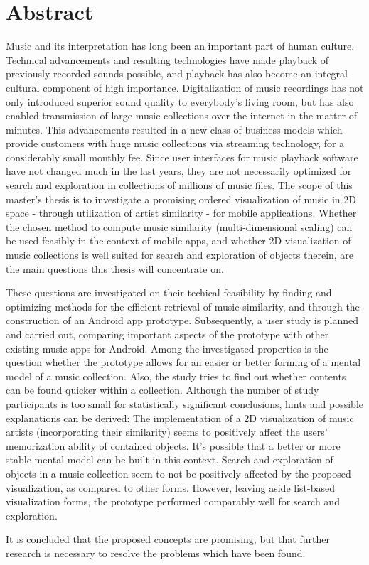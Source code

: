 \chapter*{Abstract}

Music and its interpretation has long been an important part of human culture. Technical advancements and resulting technologies have made playback of previously recorded sounds possible, and playback has also become an integral cultural component of high importance. Digitalization of music recordings has not only introduced superior sound quality to everybody's living room, but has also enabled transmission of large music collections over the internet in the matter of minutes.
This advancements resulted in a new class of business models which provide customers with huge music collections via streaming technology, for a considerably small monthly fee. Since user interfaces for music playback software have not changed much in the last years, they are not necessarily optimized for search and exploration in collections of millions of music files. The scope of this master's thesis is to investigate a promising ordered visualization of music in 2D space - through utilization of artist similarity - for mobile applications.
Whether the chosen method to compute music similarity (multi-dimensional scaling) can be used feasibly in the context of mobile apps, and whether 2D visualization of music collections is well suited for search and exploration of objects therein, are the main questions this thesis will concentrate on.

These questions are investigated on their techical feasibility by finding and optimizing methods for the efficient retrieval of music similarity, and through the construction of an Android app prototype. Subsequently, a user study is planned and carried out, comparing important aspects of the prototype with other existing music apps for Android. Among the investigated properties is the question whether the prototype allows for an easier or better forming of a mental model of a music collection. Also, the study tries to find out whether contents can be found quicker within a collection.
Although the number of study participants is too small for statistically significant conclusions, hints and possible explanations can be derived: The implementation of a 2D visualization of music artists (incorporating their similarity) seems to positively affect the users' memorization ability of contained objects. It's possible that a better or more stable mental model can be built in this context. Search and exploration of objects in a music collection seem to not be positively affected by the proposed visualization, as compared to other forms. However, leaving aside list-based visualization forms, the prototype performed comparably well for search and exploration.

It is concluded that the proposed concepts are promising, but that further research is necessary to resolve the problems which have been found.